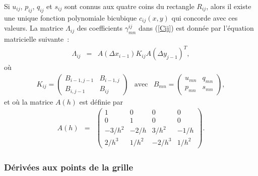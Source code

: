 \begin{lemme}
Si $u_{ij}$, $p_{ij}$, $q_{ij}$ et $s_{ij}$ sont connus aux quatre 
coins du rectangle $R_{ij}$, alors il existe une unique fonction 
polynomiale bicubique $c_{ij}(x,y)$ qui concorde avec ces valeurs. La 
matrice $\Lambda_{ij}$ des coefficients $\gamma_{mn}^{ij}$ dans 
(\ref{Cij}) est donn\'ee par l'\'equation matricielle suivante~:
\begin{eqnarray}
\label{coeffs}
\Lambda_{ij} &=& A(\Delta x_{i-1}) K_{ij} A(\Delta y_{j-1})^T,
\end{eqnarray}
o\`u
\begin{eqnarray*}
K_{ij} = \begin{pmatrix} 
B_{i-1,j-1} & B_{i-1,j}\\ 
B_{i,j-1} & B_{ij} 
\end{pmatrix} & \text{avec} & B_{mn} = 
\begin{pmatrix} 
u_{mn}&q_{mn}\\p_{mn}&s_{mn}
\end{pmatrix},
\end{eqnarray*}
et o\`u la matrice $A(h)$ est d\'efinie par 
\begin{eqnarray*}
A(h) &=& \begin{pmatrix}
1&0&0&0\\
0&1&0&0\\
-3/h^2 & -2/h & 3/h^2 & -1/h \\
2/h^3 & 1/h^2 & -2/h^3 & 1/h^2 
\end{pmatrix}.
\end{eqnarray*}

\end{lemme}

\subsubsection*{D\'eriv\'ees aux points de la grille}

